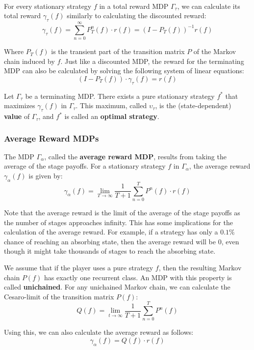 \documentclass[12pt]{article}
\begin{document}
\noindent
\\
For every stationary strategy $f$ in a total reward MDP $\Gamma_\tau$, we can calculate its total reward $\gamma_\tau(f)$ similarly to calculating the discounted reward:
\[ \gamma_\tau(f) = \sum_{n = 0}^\infty P_T^n(f) \cdot r(f) = (I - P_T(f))^{-1} r(f) \]

\noindent
Where $P_T(f)$ is the transient part of the transition matrix $P$ of the Markov chain induced by $f$.
Just like a discounted MDP, the reward for the terminating MDP can also be calculated by solving the following system of linear equations:
\[ (I - P_T(f)) \cdot \gamma_\tau(f) = r(f) \]

\noindent
Let $\Gamma_\tau$ be a terminating MDP.
There exists a pure stationary strategy $f^*$ that maximizes $\gamma_\tau(f)$ in $\Gamma_\tau$.
This maximum, called $\upsilon_\tau$, is the (state-dependent) \textbf{value} of $\Gamma_\tau$, and $f^*$ is called an \textbf{optimal strategy}.

\subsubsection{Average Reward MDPs}
The MDP $\Gamma_\alpha$, called the \textbf{average reward MDP}, results from taking the average of the stage payoffs.
For a stationary strategy $f$ in $\Gamma_\alpha$, the average reward $\gamma_\alpha(f)$ is given by:
\[ \gamma_\alpha(f) = \lim_{T \rightarrow \infty} \frac{1}{T + 1} \sum_{n = 0}^T P^n(f) \cdot r(f) \]

\noindent
Note that the average reward is the limit of the average of the stage payoffs as the number of stages approaches infinity.
This has some implications for the calculation of the average reward.
For example, if a strategy has only a $0.1\%$ chance of reaching an absorbing state, then the average reward will be $0$, even though it might take thousands of stages to reach the absorbing state.

\newpage
\noindent
We assume that if the player uses a pure strategy $f$, then the resulting Markov chain $P(f)$ has exactly one recurrent class.
An MDP with this property is called \textbf{unichained}.
For any unichained Markov chain, we can calculate the Cesaro-limit of the transition matrix $P(f)$:
\[ Q(f) = \lim_{t \rightarrow \infty} \frac{1}{T + 1} \sum_{n = 0}^T P^n(f) \]

\noindent
Using this, we can also calculate the average reward as follows:
\[ \gamma_\alpha(f) = Q(f) \cdot r(f) \]
\end{document}

